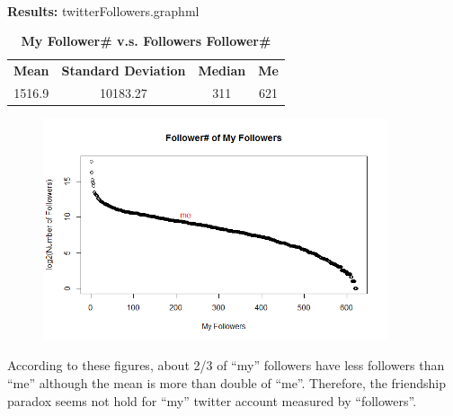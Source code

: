 \documentclass{article}
\begin{document}
		\noindent\\\textbf{Results: }twitterFollowers.graphml
		\begin{table}[!htb]
			\centering
			\caption{\textbf{My Follower\# v.s. Followers Follower\#}}
			\begin{tabular}{cccc}
				\toprule
				\textbf{Mean} & \textbf{Standard Deviation} & \textbf{Median} & \textbf{Me}\\
				1516.9 & 10183.27 & 311 & 621\\
				\bottomrule
			\end{tabular}
		\end{table}
		\begin{figure}[!htb]
			\centering
			\href{https://github.com/zhangboroy/cs532-s17/blob/master/assg04_submission/TwitterFollowers.png}
			{\includegraphics[width=0.9\textwidth]{TwitterFollowers.png}}
			\label{fig:Twitter Followers} 
		\end{figure}

		According to these figures, about 2/3 of ``my'' followers have less followers than ``me'' although the mean is more than double of ``me''. Therefore, the friendship paradox seems not hold for ``my'' twitter account measured by ``followers''.\\
\end{document}
